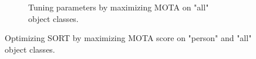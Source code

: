 \begin{figure}[!tb]
\begin{subfigure}{1.0\linewidth}
    \caption{Tuning parameters by maximizing MOTA on "all" object classes.}
    \label{fig:optimizing_tracker_all}
  \end{subfigure}
  

  \caption[Optimizing SORT by maximizing MOTA score on "person" and "all" object classes]
  {Optimizing SORT by maximizing MOTA score on "person" and "all" object classes.}
  \label{fig:optimizing_tracker} %
\end{figure}